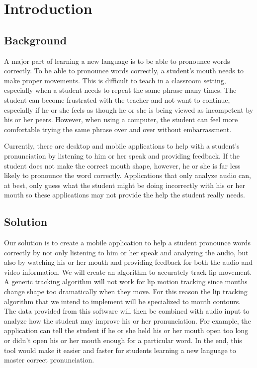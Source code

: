 \chapter{Introduction}

\section{Background}

A major part of learning a new language is to be able to pronounce words correctly. To be able to pronounce words correctly, a student's mouth needs to make proper movements. This is difficult to teach in a classroom setting, especially when a student needs to repeat the same phrase many times. The student can become frustrated with the teacher and not want to continue, especially if he or she feels as though he or she is being viewed as incompetent by his or her peers. However, when using a computer, the student can feel more comfortable trying the same phrase over and over without embarrassment.

Currently, there are desktop and mobile applications to help with a student's pronunciation by listening to him or her speak and providing feedback. If the student does not make the correct mouth shape, however, he or she is far less likely to pronounce the word correctly. Applications that only analyze audio can, at best, only guess what the student might be doing incorrectly with his or her mouth so these applications may not provide the help the student really needs.

\section{Solution}

Our solution is to create a mobile application to help a student pronounce words correctly by not only listening to him or her speak and analyzing the audio, but also by watching his or her mouth and providing feedback for both the audio and video information. We will create an algorithm to accurately track lip movement. A generic tracking algorithm will not work for lip motion tracking since mouths change shape too dramatically when they move. For this reason the lip tracking algorithm that we intend to implement will be specialized to mouth contours. The data provided from this software will then be combined with audio input to analyze how the student may improve his or her pronunciation. For example, the application can tell the student if he or she held his or her mouth open too long or didn't open his or her mouth enough for a particular word. In the end, this tool would make it easier and faster for students learning a new language to master correct pronunciation. 
